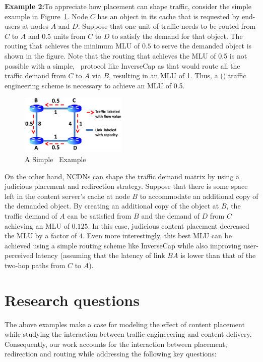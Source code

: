 \textbf{Example 2:}To appreciate how placement can shape traffic, consider the simple example in Figure~\ref{fig:NetworkExample}. Node $C$ has an object in its cache that is requested by end-users at nodes $A$ and $D$. Suppose that one unit of traffic needs to be routed from $C$ to $A$ and $0.5$ units  from $C$ to $D$ to satisfy the demand for that object. The routing that achieves the minimum MLU of $0.5$ to serve the demanded object is shown in the figure. Note that the routing that achieves the MLU of 0.5 is not possible with a simple, \unplanned\ protocol like InverseCap as that would route all the traffic demand from $C$ to $A$ via $B$, resulting in an MLU of 1. Thus, a (\planned) traffic engineering scheme is necessary to achieve an MLU of 0.5.


	\begin{figure}[h]
		\centering
		\includegraphics[width=2in]{ncdnpaper/ncdn-example}
		\caption{A Simple \ncp\ Example}
		\vspace{-.3in}
		\label{fig:NetworkExample}
	\end{figure}


On the other hand, NCDNs can shape the traffic demand matrix by using a judicious placement and redirection strategy. Suppose that there is some space left in the content server's cache at node $B$ to accommodate an additional copy of the demanded object. By creating an additional copy of the object at $B$, the traffic demand of $A$ can be satisfied from $B$ and the demand of $D$ from $C$ achieving an MLU of $0.125$. In this case, judicious content placement decreased the MLU by a factor of $4$. Even more interestingly, this best MLU can be achieved using a simple routing scheme like InverseCap while also improving user-perceived latency (assuming that the latency of link $BA$ is lower than that of the two-hop paths from $C$ to $A$).

\section{Research questions}

The above examples make a case for modeling the effect of content placement while studying the interaction between traffic engineeering and content delivery. Consequently, our work accounts for the interaction between placement, redirection and routing while addressing the following key questions: 

